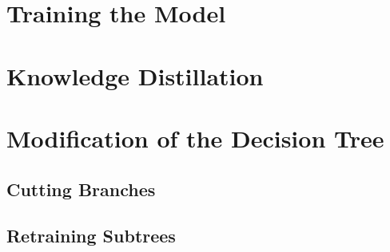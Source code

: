 



\section{Training the Model}



\section{Knowledge Distillation}






\section{Modification of the Decision Tree}
\label{sec:modification}




\subsection{Cutting Branches}



\subsection{Retraining Subtrees}

